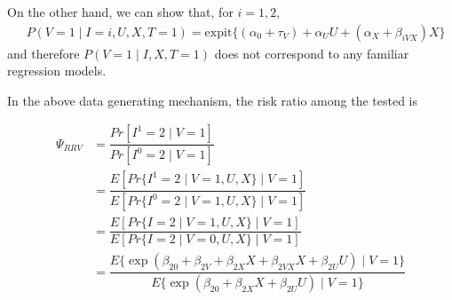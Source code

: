 \documentclass{article}
\def\expit{\mathrm{expit}}
\begin{document}
On the other hand, we can show that, for $i=1,2$,
\begin{align*}
    & P(V=1\mid I=i, U, X, T=1)= \expit\{(\alpha_0 + \tau_V) + \alpha_U U + (\alpha_X + \beta_{iVX})X\}
\end{align*}
and therefore $P(V=1\mid I, X, T=1)$ does not correspond to any familiar regression models.

In the above data generating mechanism, the risk ratio among the tested is

\begin{align*}
    \Psi_{RRV} &= \dfrac{Pr[I^1=2\mid V=1]}{Pr[I^0=2\mid V=1]}\\
    &= \dfrac{E[Pr\{I^1=2\mid V=1, U, X\}\mid V=1]}{E[Pr\{I^0=2\mid V=1, U, X\}\mid V=1]}\\
    &= \dfrac{E[Pr\{I=2\mid V=1, U, X\}\mid V=1]}{E[Pr\{I=2\mid V=0, U, X\}\mid V=1]}\\
    &= \dfrac{E\{\exp(\beta_{20} + \beta_{2V} + \beta_{2X}X + \beta_{2VX}X + \beta_{2U}U)\mid V=1\}}{E\{\exp(\beta_{20} +  \beta_{2X}X  + \beta_{2U}U)\mid V=1\}}\\
\end{align*}
\end{document}
